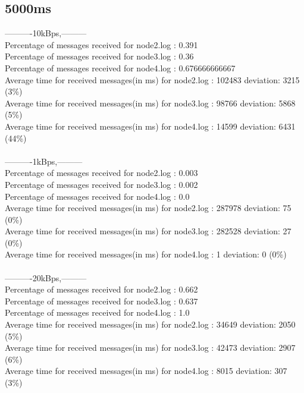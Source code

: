     \subsection{5000ms}\label{RawResults:5000ms}
        ----------10kBps,---------\\
        Percentage of messages received for node2.log : 0.391\\
        Percentage of messages received for node3.log : 0.36\\
        Percentage of messages received for node4.log : 0.676666666667\\
        Average time for received messages(in ms) for  node2.log : 102483 	deviation: 3215 (3\%)\\
        Average time for received messages(in ms) for  node3.log : 98766 	deviation: 5868 (5\%)\\
        Average time for received messages(in ms) for  node4.log : 14599 	deviation: 6431 (44\%)\\\\
        ----------1kBps,---------\\
        Percentage of messages received for node2.log : 0.003\\
        Percentage of messages received for node3.log : 0.002\\
        Percentage of messages received for node4.log : 0.0\\
        Average time for received messages(in ms) for  node2.log : 287978 	deviation: 75 (0\%)\\
        Average time for received messages(in ms) for  node3.log : 282528 	deviation: 27 (0\%)\\
        Average time for received messages(in ms) for  node4.log : 1 	deviation: 0 (0\%)\\\\
        ----------20kBps,---------\\
        Percentage of messages received for node2.log : 0.662\\
        Percentage of messages received for node3.log : 0.637\\
        Percentage of messages received for node4.log : 1.0\\
        Average time for received messages(in ms) for  node2.log : 34649 	deviation: 2050 (5\%)\\
        Average time for received messages(in ms) for  node3.log : 42473 	deviation: 2907 (6\%)\\
        Average time for received messages(in ms) for  node4.log : 8015 	deviation: 307 (3\%)\\\\
